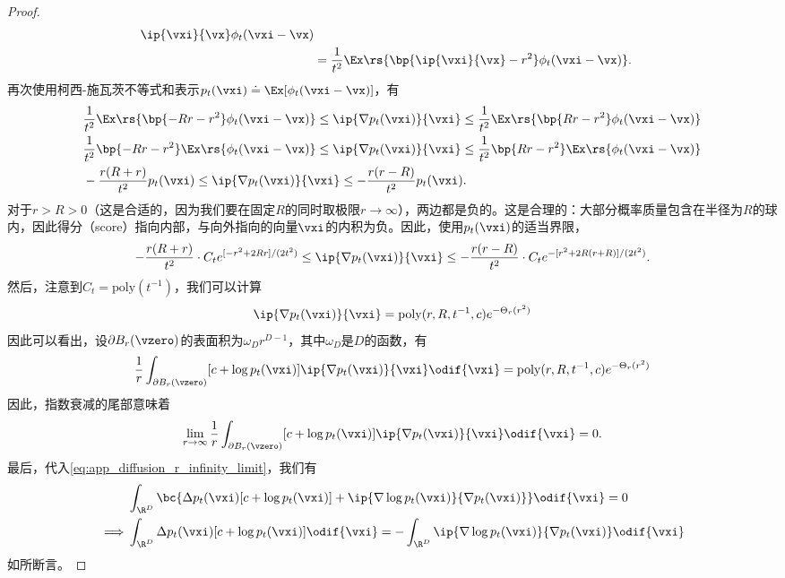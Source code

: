 \documentclass[../../book-main_zh.tex]{subfiles}
\begin{document}
\begin{proof}
\begin{align}
{{        \ip{\vxi}{\vx}}\phi_{t}(\vxi - \vx)} \\
        &= \frac{1}{t^{2}}\Ex\rs{\bp{\ip{\vxi}{\vx} -
        r^{2}}\phi_{t}(\vxi - \vx)}.
    \end{align}
    再次使用柯西-施瓦茨不等式和表示\(p_{t}(\vxi) \doteq \Ex[\phi_{t}(\vxi - \vx)]\)，有
    \begin{align}
        &\frac{1}{t^{2}}\Ex\rs{\bp{-Rr - r^{2}}\phi_{t}(\vxi - \vx)}
        \leq \ip{\nabla p_{t}(\vxi)}{\vxi} \leq
        \frac{1}{t^{2}}\Ex\rs{\bp{Rr - r^{2}}\phi_{t}(\vxi - \vx)} \\
        &\frac{1}{t^{2}}\bp{-Rr - r^{2}}\Ex\rs{\phi_{t}(\vxi - \vx)}
        \leq \ip{\nabla p_{t}(\vxi)}{\vxi} \leq \frac{1}{t^{2}}\bp{Rr
        - r^{2}}\Ex\rs{\phi_{t}(\vxi - \vx)} \\
        &-\frac{r(R + r)}{t^{2}}p_{t}(\vxi) \leq \ip{\nabla
        p_{t}(\vxi)}{\vxi} \leq -\frac{r(r - R)}{t^{2}}p_{t}(\vxi).
    \end{align}
    对于\(r > R > 0\)（这是合适的，因为我们要在固定\(R\)的同时取极限\(r \to \infty\)），两边都是负的。这是合理的：大部分概率质量包含在半径为\(R\)的球内，因此得分（score）指向内部，与向外指向的向量\(\vxi\)的内积为负。因此，使用\(p_{t}(\vxi)\)的适当界限，
    \begin{equation}
        -\frac{r(R + r)}{t^{2}}\cdot C_{t}e^{[-r^{2} + 2Rr]/(2t^{2})}
        \leq \ip{\nabla p_{t}(\vxi)}{\vxi} \leq -\frac{r(r -
        R)}{t^{2}}\cdot C_{t}e^{-[r^{2} + 2R(r + R)]/(2t^{2})}.
    \end{equation}
    然后，注意到\(C_{t} = \mathrm{poly}(t^{-1})\)，我们可以计算
    \begin{equation}
        [c + \log p_{t}(\vxi)]\ip{\nabla p_{t}(\vxi)}{\vxi} =
        \mathrm{poly}(r, R, t^{-1}, c)e^{-\Theta_{r}(r^{2})}
    \end{equation}
    因此可以看出，设\(\partial B_{r}(\vzero)\)的表面积为\(\omega_{D} r^{D - 1}\)，其中\(\omega_{D}\)是\(D\)的函数，有
    \begin{equation}
        \frac{1}{r}\int_{\partial B_{r}(\vzero)}[c + \log
        p_{t}(\vxi)]\ip{\nabla p_{t}(\vxi)}{\vxi}\odif{\vxi} =
        \mathrm{poly}(r, R, t^{-1}, c)e^{-\Theta_{r}(r^{2})}
    \end{equation}
    因此，指数衰减的尾部意味着
    \begin{equation}
        \lim_{r \to \infty}\frac{1}{r}\int_{\partial B_{r}(\vzero)}[c
        + \log p_{t}(\vxi)]\ip{\nabla p_{t}(\vxi)}{\vxi}\odif{\vxi} = 0.
    \end{equation}
    最后，代入\eqref{eq:app_diffusion_r_infinity_limit}，我们有
    \begin{align}
        &\int_{\R^{D}}\bc{\Delta p_{t}(\vxi)[c + \log p_{t}(\vxi)] +
        \ip{\nabla \log p_{t}(\vxi)}{\nabla p_{t}(\vxi)}}\odif{\vxi} = 0 \\
        \implies
        &\int_{\R^{D}}\Delta p_{t}(\vxi)[c + \log
        p_{t}(\vxi)]\odif{\vxi} = -\int_{\R^{D}}\ip{\nabla \log
        p_{t}(\vxi)}{\nabla p_{t}(\vxi)}\odif{\vxi}
    \end{align}
    如所断言。
\end{proof}
\end{document}
